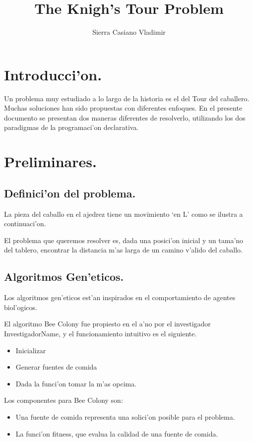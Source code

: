 \documentclass[11pt]{article}
\title{The Knigh's Tour Problem}
\author{Sierra Casiano Vladimir}
\begin{document}
    \maketitle
    
    \section{Introducci'on.}

    Un problema muy estudiado a lo largo de la historia es el del Tour del caballero.
    Muchas soluciones han sido propuestas con diferentes enfoques. En el presente
    documento se presentan dos maneras diferentes de resolverlo, utilizando los dos paradigmas de
    la programaci'on declarativa.


    \section{Preliminares.}

    \subsection{Definici'on del problema.}
    La pieza del caballo en el ajedrez tiene un movimiento `en L' \; como
    se ilustra a continuaci'on.

    El problema que queremos resolver es, dada una posici'on inicial y un tama'no del tablero,
    encontrar la distancia m'as larga de un camino v'alido del caballo.

    \subsection{Algoritmos Gen'eticos.}
    Los algoritmos gen'eticos est'an inspirados en el comportamiento de
    agentes biol'ogicos.

    El algoritmo Bee Colony fue propiesto en el a'no por el investigador InvestigadorName,
    y el funcionamiento intuitivo es el siguiente.

    \begin{itemize}
        \item Inicializar
        \item Generar fuentes de comida
        \item Dada la funci'on tomar la m'as opcima.
    \end{itemize}
    \vspace{4mm}

    Los componentes para Bee Colony son:
    \begin{itemize}
        \item Una fuente de comida representa una solici'on posible para el problema.
        \item La funci'on fitness, que evalua la calidad de una fuente de comida.
    \end{itemize}
\end{document}

